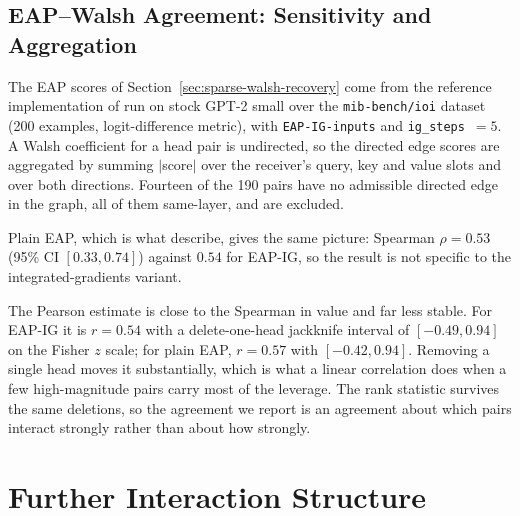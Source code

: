 \documentclass{article}
\begin{document}
%


\subsection{EAP--Walsh Agreement: Sensitivity and Aggregation}
\label{app:eap-walsh}

The EAP scores of Section~\ref{sec:sparse-walsh-recovery} come from the reference
implementation of \citet{mueller2025mib} run on stock GPT-2 small over the
\texttt{mib-bench/ioi} dataset (200 examples, logit-difference metric), with
\texttt{EAP-IG-inputs} and \texttt{ig\_steps}~$=5$. A Walsh coefficient for a head pair
is undirected, so the directed edge scores are aggregated by summing $|$score$|$ over the
receiver's query, key and value slots and over both directions. Fourteen of the 190 pairs
have no admissible directed edge in the graph, all of them same-layer, and are excluded.

Plain EAP, which is what \citet{syed2023attribution} describe, gives the same picture:
Spearman $\rho = 0.53$ (95\% CI $[0.33, 0.74]$) against $0.54$ for EAP-IG, so the result
is not specific to the integrated-gradients variant.

The Pearson estimate is close to the Spearman in value and far less stable. For EAP-IG it
is $r = 0.54$ with a delete-one-head jackknife interval of $[-0.49, 0.94]$ on the Fisher
$z$ scale; for plain EAP, $r = 0.57$ with $[-0.42, 0.94]$. Removing a single head moves it
substantially, which is what a linear correlation does when a few high-magnitude pairs
carry most of the leverage. The rank statistic survives the same deletions, so the
agreement we report is an agreement about which pairs interact strongly rather than about
how strongly.


\section{Further Interaction Structure}
\end{document}
